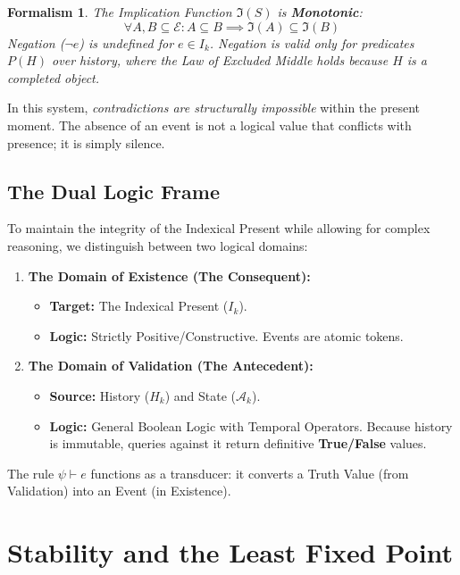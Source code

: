 \documentclass[12pt, a4paper]{article}
\newtheorem{formalism}{Formalism}
\begin{document}
\begin{formalism}
The Implication Function $\mathfrak{I}(S)$ is \textbf{Monotonic}:
$$\forall A, B \subseteq \mathcal{E} : A \subseteq B \implies \mathfrak{I}(A) \subseteq \mathfrak{I}(B)$$
Negation ($\neg e$) is undefined for $e \in I_k$.
Negation is valid only for predicates $P(H)$ over history, where the Law of Excluded Middle holds because $H$ is a completed object.
\end{formalism}

In this system, \textit{contradictions are structurally impossible} within the present moment. The absence of an event is not a logical value that conflicts with presence; it is simply silence.

\subsection{The Dual Logic Frame}

To maintain the integrity of the Indexical Present while allowing for complex reasoning, we distinguish between two logical domains:

\begin{enumerate}
    \item \textbf{The Domain of Existence (The Consequent):}
    \begin{itemize}
        \item \textbf{Target:} The Indexical Present ($I_k$).
        \item \textbf{Logic:} Strictly Positive/Constructive. Events are atomic tokens.
    \end{itemize}

    \item \textbf{The Domain of Validation (The Antecedent):}
    \begin{itemize}
        \item \textbf{Source:} History ($H_k$) and State ($\mathcal{A}_k$).
        \item \textbf{Logic:} General Boolean Logic with Temporal Operators. Because history is immutable, queries against it return definitive \textbf{True/False} values.
    \end{itemize}
\end{enumerate}

The rule $\psi \vdash e$ functions as a transducer: it converts a Truth Value (from Validation) into an Event (in Existence).

\section{Stability and the Least Fixed Point}
\end{document}
